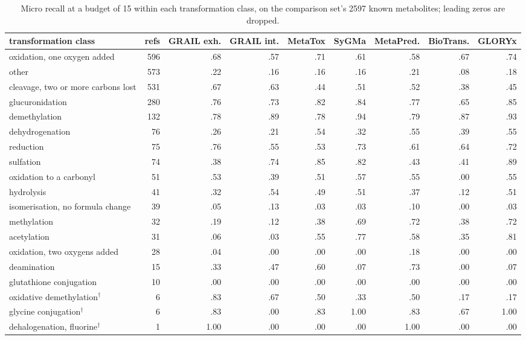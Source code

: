 \begin{table}[t]
\centering\scriptsize
\begin{threeparttable}
\caption{Micro recall at a budget of 15 within each transformation class, on the comparison set's 2597 known metabolites; leading zeros are dropped.}
\label{tab:si-chemistry}
\setlength{\tabcolsep}{3.5pt}
\begin{tabular}{@{}lrrrrrrrr@{}}
\toprule
transformation class & refs & GRAIL exh. & GRAIL int. & MetaTox & SyGMa & MetaPred. & BioTrans. & GLORYx \\
\midrule
oxidation, one oxygen added & 596 & .68 & .57 & .71 & .61 & .58 & .67 & .74 \\
other & 573 & .22 & .16 & .16 & .16 & .21 & .08 & .18 \\
cleavage, two or more carbons lost & 531 & .67 & .63 & .44 & .51 & .52 & .38 & .45 \\
glucuronidation & 280 & .76 & .73 & .82 & .84 & .77 & .65 & .85 \\
demethylation & 132 & .78 & .89 & .78 & .94 & .79 & .87 & .93 \\
dehydrogenation & 76 & .26 & .21 & .54 & .32 & .55 & .39 & .55 \\
reduction & 75 & .76 & .55 & .53 & .73 & .61 & .64 & .72 \\
sulfation & 74 & .38 & .74 & .85 & .82 & .43 & .41 & .89 \\
oxidation to a carbonyl & 51 & .53 & .39 & .51 & .57 & .55 & .00 & .55 \\
hydrolysis & 41 & .32 & .54 & .49 & .51 & .37 & .12 & .51 \\
isomerisation, no formula change & 39 & .05 & .13 & .03 & .03 & .10 & .00 & .03 \\
methylation & 32 & .19 & .12 & .38 & .69 & .72 & .38 & .72 \\
acetylation & 31 & .06 & .03 & .55 & .77 & .58 & .35 & .81 \\
oxidation, two oxygens added & 28 & .04 & .00 & .00 & .00 & .18 & .00 & .00 \\
deamination & 15 & .33 & .47 & .60 & .07 & .73 & .00 & .07 \\
glutathione conjugation & 10 & .00 & .00 & .00 & .00 & .00 & .00 & .00 \\
oxidative demethylation$^{\dagger}$ & 6 & .83 & .67 & .50 & .33 & .50 & .17 & .17 \\
glycine conjugation$^{\dagger}$ & 6 & .83 & .00 & .83 & 1.00 & .83 & .67 & 1.00 \\
dehalogenation, fluorine$^{\dagger}$ & 1 & 1.00 & .00 & .00 & .00 & 1.00 & .00 & .00 \\

\end{tabular}
\end{threeparttable}
\end{table}
